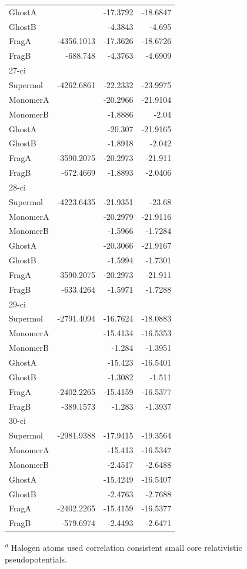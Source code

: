 \documentclass[journal=jctcce,manuscript=article]{achemso}
\begin{document}
\begin{spacing}{1}
\begin{longtable}{lRRR}
    GhostA &       & -17.3792 & -18.6847 \\
    GhostB &       & -4.3843 & -4.695 \\
    FragA & -4356.1013 & -17.3626 & -18.6726 \\
    FragB & -688.748 & -4.3763 & -4.6909 \\
    27-ci &       &       &  \\
    Supermol & -4262.6861 & -22.2332 & -23.9975 \\
    MonomerA &       & -20.2966 & -21.9104 \\
    MonomerB &       & -1.8886 & -2.04 \\
    GhostA &       & -20.307 & -21.9165 \\
    GhostB &       & -1.8918 & -2.042 \\
    FragA & -3590.2075 & -20.2973 & -21.911 \\
    FragB & -672.4669 & -1.8893 & -2.0406 \\
    28-ci &       &       &  \\
    Supermol & -4223.6435 & -21.9351 & -23.68 \\
    MonomerA &       & -20.2979 & -21.9116 \\
    MonomerB &       & -1.5966 & -1.7284 \\
    GhostA &       & -20.3066 & -21.9167 \\
    GhostB &       & -1.5994 & -1.7301 \\
    FragA & -3590.2075 & -20.2973 & -21.911 \\
    FragB & -633.4264 & -1.5971 & -1.7288 \\
    29-ci &       &       &  \\
    Supermol & -2791.4094 & -16.7624 & -18.0883 \\
    MonomerA &       & -15.4134 & -16.5353 \\
    MonomerB &       & -1.284 & -1.3951 \\
    GhostA &       & -15.423 & -16.5401 \\
    GhostB &       & -1.3082 & -1.511 \\
    FragA & -2402.2265 & -15.4159 & -16.5377 \\
    FragB & -389.1573 & -1.283 & -1.3937 \\
    30-ci &       &       &  \\
    Supermol & -2981.9388 & -17.9415 & -19.3564 \\
    MonomerA &       & -15.413 & -16.5347 \\
    MonomerB &       & -2.4517 & -2.6488 \\
    GhostA &       & -15.4249 & -16.5407 \\
    GhostB &       & -2.4763 & -2.7688 \\
    FragA & -2402.2265 & -15.4159 & -16.5377 \\
    FragB & -579.6974 & -2.4493 & -2.6471 \\
  \hline
\end{longtable}
\vspace{-0.3cm}
\textsuperscript{\emph{a}} Halogen atoms used correlation consistent
small core relativistic pseudopotentials.\cite{doi:10.1063/1.1622924,doi:10.1021/jp065887l}


\end{spacing}
\end{document}
